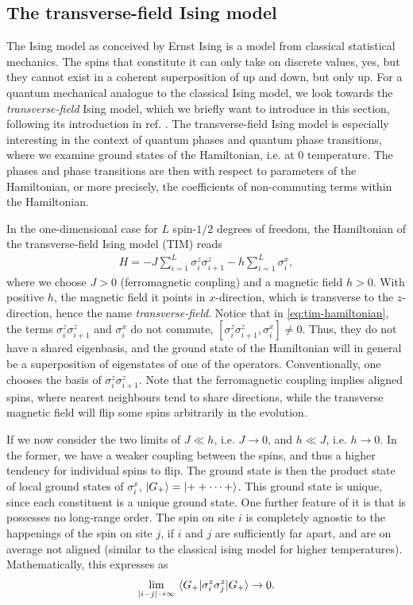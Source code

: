 \subsection{The transverse-field Ising model}

The Ising model as conceived by Ernst Ising is a model from classical
statistical mechanics. The spins that constitute it can only take on discrete
values, yes, but they cannot exist in a coherent superposition of up and down,
but only up. For a quantum mechanical analogue to the classical Ising model, we
look towards the \emph{transverse-field} Ising model, which we briefly want to
introduce in this section, following its introduction in ref.
\cite{langLectureNotesTopological2021}.  The transverse-field Ising model is
especially interesting in the context of quantum phases and quantum phase
transitions, where we examine ground states of the Hamiltonian, i.e. at $0$
temperature. The phases and phase transitions are then with respect to
parameters of the Hamiltonian, or more precisely, the coefficients of
non-commuting terms within the Hamiltonian.

In the one-dimensional
case for $L$ spin-$1 /2$ degrees of freedom, the Hamiltonian of the
transverse-field Ising model (TIM) reads
\begin{align}\label{eq:tim-hamiltonian}
  H = -J\sum_{i=1}^L \sigma_i^z \sigma_{i+1}^z - h\sum_{i=1}^L \sigma_i^x
,\end{align}
where we choose $J>0$ (ferromagnetic coupling) and a magnetic field $h>0$. With
positive $h$, the magnetic field it points in $x$-direction, which is transverse to the
$z$-direction, hence the name \emph{transverse-field}. 
Notice that in \cref{eq:tim-hamiltonian}, the terms $\sigma_i^z\sigma_{i+1}^z$
and $\sigma_i^x$ do not commute, $[\sigma_i^z\sigma_{i+1}^z,\sigma_i^x]\neq 0$.
Thus, they do not have a shared eigenbasis, and the ground state of the
Hamiltonian will in general be a superposition of eigenstates of one of the
operators. Conventionally, one chooses the basis of $\sigma_i^z\sigma_{i+1}^z$.
Note that the ferromagnetic coupling implies aligned spins, where nearest
neighbours tend to share directions, while the transverse magnetic field will
flip some spins arbitrarily in the evolution.

If we now consider the two limits of $J \ll h$, i.e. $J\to 0$,  and $h \ll J$,
i.e. $h \to 0$. In the former, we have a weaker coupling between the spins, and
thus a higher tendency for individual spins to flip. The ground state is then
the product state of local ground states of $\sigma_i^x$, $\ket{G_+} =
\ket{++\cdots +}$. This ground state is unique, since each constituent is a
unique ground state. One further feature of it is that is possesses no
long-range order. The spin on site $i$ is completely agnostic to the happenings
of the spin on site $j$, if $i$ and $j$ are sufficiently far apart, and are on
average not aligned (similar to the classical ising model for higher
temperatures). Mathematically, this expresses as 
\begin{align}
\lim_{\abs{i-j}\to\infty} \expval{\sigma_i^z\sigma_j^z}{G_+} \to 0
.\end{align}

